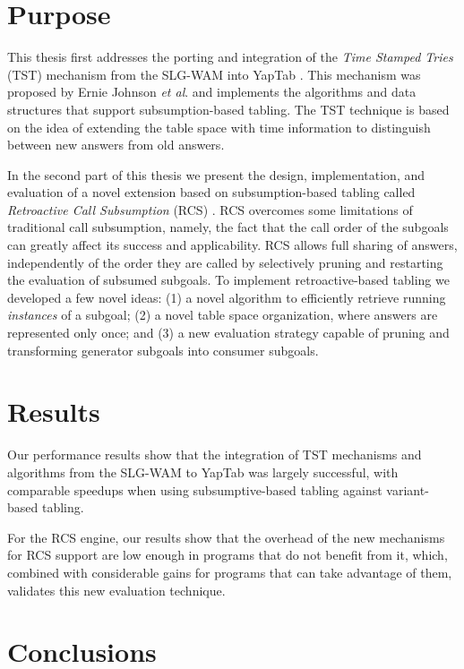 \documentclass[9pt,a4paper]{extarticle}
\begin{document}
\begin{multicols}{2}
\section{Purpose}

This thesis first addresses the porting and integration of the \emph{Time Stamped Tries} (TST)
mechanism from the SLG-WAM \cite{Sagonas-PhD} into YapTab \cite{Rocha-00a}.  This mechanism was proposed by
Ernie Johnson \textit{et al}. \cite{Johnson-99,Johnson-00} and implements the algorithms and data structures
that support subsumption-based tabling. The TST technique is based on the idea of extending the table space with
time information to distinguish between new answers from old answers.

In the second part of this thesis we present the design, implementation, and evaluation of a novel extension
based on subsumption-based tabling called \emph{Retroactive Call Subsumption} (RCS) \cite{cruz-jelia10}.
RCS overcomes some limitations of traditional call subsumption, namely, the fact that the call order of the subgoals
can greatly affect its success and applicability. RCS allows full sharing of answers,
independently of the order they are called by selectively pruning and restarting the evaluation of
subsumed subgoals. To implement retroactive-based tabling we developed a few novel ideas: (1) a novel algorithm
to efficiently retrieve running \emph{instances} of a subgoal; (2) a novel table
space organization, where answers are represented only once; and (3) a new evaluation strategy capable
of pruning and transforming generator subgoals into consumer subgoals.
   
\section{Results}
   
Our performance results show that the integration of TST mechanisms and algorithms from the SLG-WAM
to YapTab was largely successful, with comparable speedups when using subsumptive-based tabling
against variant-based tabling.

For the RCS engine, our results show that the overhead of the new mechanisms for RCS support are
low enough in programs that do not benefit from it, which, combined with considerable gains for
programs that can take advantage of them, validates this new evaluation technique.
   
\section{Conclusions}


\end{multicols}
\end{document}
